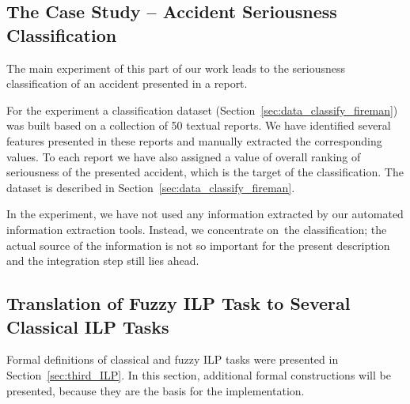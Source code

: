 
\subsection{The Case Study -- Accident Seriousness Classification} \label{sec:fuzzy_case}



The main experiment of this part of our work leads to the seriousness classification of an accident presented in a report. %

For the experiment a classification dataset (Section~\ref{sec:data_classify_fireman}) was built based on a collection of 50 textual reports. We have identified several features presented in these reports and manually extracted the corresponding values. To each report we have also assigned a value of overall ranking of seriousness of the presented accident, which is the target of the classification. The dataset is described in Section~\ref{sec:data_classify_fireman}. 

In the experiment, we have not used any information extracted by our automated information extraction tools. Instead, we concentrate on~the classification; the actual source of the information is not so important for the present description and the integration step still lies ahead.






\subsection{Translation of Fuzzy ILP Task to Several Classical ILP Tasks} \label{sec:fuzzy_ilp_task_translation}

Formal definitions of classical and fuzzy ILP tasks were presented in Section~\ref{sec:third_ILP}. In this section, additional formal constructions will be presented, because they are the basis for the implementation.


